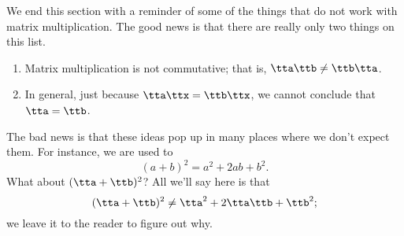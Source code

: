 We end this section with a reminder of some of the things that do not work with matrix multiplication. The good news is that there are really only two things on this list.
\begin{enumerate}
\item	Matrix multiplication is not commutative; that is, $\tta\ttb \neq \ttb\tta$. 
\item In general, just because $\tta\ttx = \ttb\ttx$, we cannot conclude that $\tta=\ttb$.
\end{enumerate}
The bad news is that these ideas pop up in many places where we don't expect them. For instance, we are used to 
\[
(a+b)^2 = a^2+2ab+b^2.
\]
What about $(\tta+\ttb)^2$? All we'll say here is that 
\[
(\tta+\ttb)^2 \neq \tta^2+2\tta\ttb+\ttb^2;
\]
we leave it to the reader to figure out why.\\











